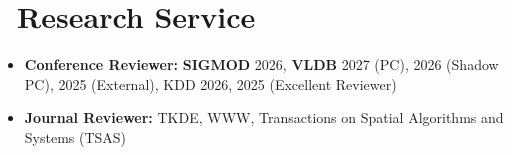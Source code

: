 \documentclass{resume}
\begin{document}
\section{\faUsers\ \textbf{Research Service}}
\begin{itemize}
  \item \textbf{Conference Reviewer:}  \textbf{SIGMOD} 2026, \textbf{VLDB} 2027 (PC), 2026 (Shadow PC), 2025 (External), KDD 2026, 2025 (Excellent Reviewer)
  \item \textbf{Journal Reviewer:} TKDE, WWW, Transactions on Spatial Algorithms and Systems (TSAS)
\end{itemize}







\end{document}
